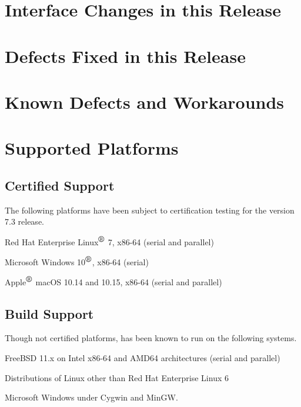 \documentclass[letterpaper]{scrartcl}
\begin{document}
\section{Interface Changes in this Release}


\newpage
\section{Defects Fixed in this Release}


\newpage
\section{Known Defects and Workarounds}


\newpage
\section{Supported Platforms}
\subsection*{Certified Support}
The following platforms have been subject to certification testing for the
\Xyce{} version 7.3 release.
\begin{XyceItemize}
  \item Red Hat Enterprise Linux${}^{\mbox{\textregistered}}$ 7, x86-64 (serial and parallel)
  \item Microsoft Windows 10${}^{\mbox{\textregistered}}$, x86-64 (serial)
  \item Apple${}^{\mbox{\textregistered}}$ macOS 10.14 and 10.15, x86-64 (serial and parallel)
\end{XyceItemize}


\subsection*{Build Support}
Though not certified platforms, \Xyce{} has been known to run on the following
systems.
\begin{XyceItemize}
  \item FreeBSD 11.x on Intel x86-64 and AMD64 architectures (serial
    and parallel)
  \item Distributions of Linux other than Red Hat Enterprise Linux 6
  \item Microsoft Windows under Cygwin and MinGW.
\end{XyceItemize}
\end{document}
